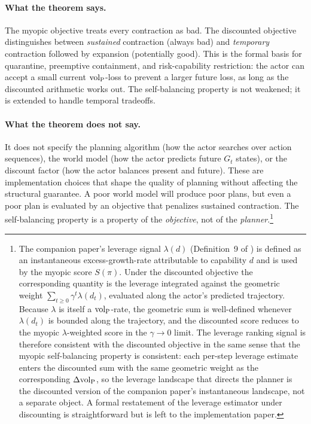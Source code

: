 \paragraph{What the theorem says.} The myopic objective treats every
contraction as bad. The discounted objective distinguishes between
\emph{sustained} contraction (always bad) and \emph{temporary} contraction
followed by expansion (potentially good). This is the formal basis for
quarantine, preemptive containment, and risk-capability restriction: the actor
can accept a small current ${\operatorname{vol}_{\mathrm{P}}}$-loss to prevent a larger future loss, as
long as the discounted arithmetic works out. The self-balancing property is
not weakened; it is extended to handle temporal tradeoffs.

\paragraph{What the theorem does not say.} It does not specify the planning
algorithm (how the actor searches over action sequences), the world model
(how the actor predicts future $G_t$ states), or the discount factor (how the
actor balances present and future). These are implementation choices that
shape the quality of planning without affecting the structural guarantee. A
poor world model will produce poor plans, but even a poor plan is evaluated by
an objective that penalizes sustained contraction. The self-balancing property
is a property of the \emph{objective}, not of the \emph{planner}.\footnote{The
companion paper's leverage signal $\lambda(d)$
(Definition~9 of \citet{lasser2026poset}) is defined as an instantaneous
excess-growth-rate attributable to capability $d$ and is used by the
myopic score $S(\pi)$. Under the discounted objective the corresponding
quantity is the leverage integrated against the geometric weight
$\sum_{t \geq 0} \gamma^t \lambda(d_t)$, evaluated along the actor's
predicted trajectory. Because $\lambda$ is itself a ${\operatorname{vol}_{\mathrm{P}}}$-rate, the
geometric sum is well-defined whenever $\lambda(d_t)$ is bounded along the
trajectory, and the discounted score reduces to the myopic
$\lambda$-weighted score in the $\gamma \to 0$ limit. The leverage
ranking signal is therefore consistent with the discounted objective in
the same sense that the myopic self-balancing property is consistent: each
per-step leverage estimate enters the discounted sum with the same
geometric weight as the corresponding $\Delta{\operatorname{vol}_{\mathrm{P}}}$, so the leverage
landscape that directs the planner is the discounted version of the
companion paper's instantaneous landscape, not a separate object. A
formal restatement of the leverage estimator under discounting is
straightforward but is left to the implementation paper.}
